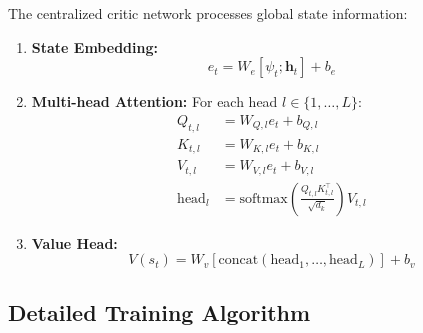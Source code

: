 The centralized critic network processes global state information:

\begin{enumerate}
\item \textbf{State Embedding:}
   \[
   e_t = W_e[\psi_t; \mathbf{h}_t] + b_e
   \]

\item \textbf{Multi-head Attention:}
   For each head $l \in \{1,\ldots,L\}$:
   \begin{align*}
   Q_{t,l} &= W_{Q,l}e_t + b_{Q,l} \\
   K_{t,l} &= W_{K,l}e_t + b_{K,l} \\
   V_{t,l} &= W_{V,l}e_t + b_{V,l} \\
   \text{head}_l &= \text{softmax}\left(\frac{Q_{t,l}K_{t,l}^\top}{\sqrt{d_k}}\right)V_{t,l}
   \end{align*}

\item \textbf{Value Head:}
   \[
   V(s_t) = W_v[\text{concat}(\text{head}_1,\ldots,\text{head}_L)] + b_v
   \]
\end{enumerate}

\subsection*{Detailed Training Algorithm}

